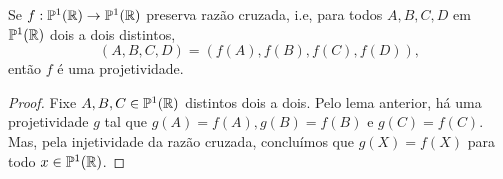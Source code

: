 \begin{thm}
Se \(f:\mathbb{P}^1(\mathbb{R}) \to \mathbb{P}^1(\mathbb{R})\) preserva razão cruzada, i.e, para todos \(A,B,C,D\) em \(\mathbb{P}^1(\mathbb{R})\) dois a dois distintos, 
\begin{equation}
  (A,B,C,D) = (f(A),f(B),f(C),f(D)),
\end{equation}
então \(f\) é uma projetividade.
\end{thm}

\begin{proof}
Fixe \(A,B,C \in \mathbb{P}^1(\mathbb{R})\) distintos dois a dois.
Pelo lema anterior, há uma projetividade \(g\) tal que \(g(A) = f(A), g(B) = f(B)\) e \(g(C) = f(C)\). Mas, pela injetividade da razão cruzada, concluímos que \(g(X) = f(X)\) para todo \(x\in \mathbb{P}^1(\mathbb{R})\).
\end{proof}

